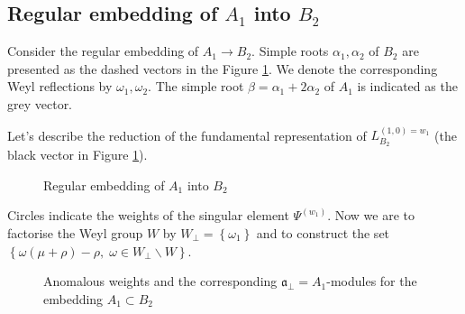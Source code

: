 \documentclass[a4paper,12pt]{article}
\theoremstyle{definition} \newtheorem{Def}{Definition}
\begin{document}
\subsection{Regular embedding of $A_1$ into $B_2$}
\label{sec:regul-embedd-a_1}

Consider the regular embedding of $A_1\to B_2$. Simple roots $\alpha_1, \alpha_2$ of $B_2$ are presented as the dashed vectors in the Figure \ref{fig:B2_A1}. We denote the corresponding Weyl reflections by $\omega_1, \omega_2$. The simple root $\beta = \alpha_1+2\alpha_2$ of $A_1$ is indicated as the grey vector.

Let's describe the reduction of the fundamental representation of $L^{(1,0)=w_1}_{B_2}$ (the black vector in Figure \ref{fig:B2_A1}).
\begin{figure}[th]
  \noindent{}
  \caption{Regular embedding of $A_1$ into $B_2$}
  \label{fig:B2_A1}
\end{figure}
Circles indicate the weights of the singular element $\Psi^{(w_1)}$.
Now we are to factorise the Weyl group $W$ by $W_{\bot}=\left\{\omega_1\right\}$ and to construct the set $\left\{\omega(\mu+\rho)-\rho,\; \omega\in W_{\bot}\backslash W\right\}$. 
\begin{figure}[t]
  \noindent{}
  \caption{Anomalous weights and the corresponding $\mathfrak{a}_{\bot}=A_1$-modules for the embedding $A_1\subset B_2$}
  \label{fig:B2_A1_2}
\end{figure}
\end{document}
